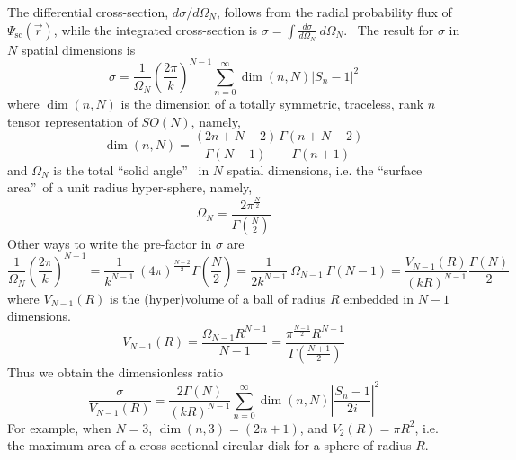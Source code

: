 \documentclass{article}%
\begin{document}
The differential cross-section, $d\sigma/d\Omega_{N}$, follows from the radial
probability flux of $\Psi_{\text{sc}}\left(  \overrightarrow{r}\right)  $,
while the integrated cross-section is $\sigma=\int\frac{d\sigma}{d\Omega_{N}%
}~d\Omega_{N}$. \ The result for $\sigma$ in $N$ spatial dimensions is%
\begin{equation}
\sigma=\frac{1}{\Omega_{N}}\left(  \frac{2\pi}{k}\right)  ^{N-1}\sum
_{n=0}^{\infty}\dim\left(  n,N\right)  \left\vert S_{n}-1\right\vert ^{2}
\label{SigmaN}%
\end{equation}
where $\dim\left(  n,N\right)  $ is the dimension of a totally symmetric,
traceless, rank $n$ tensor representation of $SO\left(  N\right)  $, namely,%
\begin{equation}
\dim\left(  n,N\right)  =\frac{\left(  2n+N-2\right)  }{\Gamma\left(
N-1\right)  }\frac{\Gamma\left(  n+N-2\right)  }{\Gamma\left(  n+1\right)  }%
\end{equation}
and $\Omega_{N}$ is the total \textquotedblleft solid angle\textquotedblright%
\ in $N$ spatial dimensions, i.e. the \textquotedblleft surface
area\textquotedblright\ of a unit radius hyper-sphere, namely,%
\begin{equation}
\Omega_{N}=\frac{2\pi^{\frac{N}{2}}}{\Gamma\left(  \frac{N}{2}\right)  }%
\end{equation}
Other ways to write the pre-factor in $\sigma$ are
\begin{equation}
\frac{1}{\Omega_{N}}\left(  \frac{2\pi}{k}\right)  ^{N-1}=\frac{1}{k^{N-1}%
}~\left(  4\pi\right)  ^{\frac{N-2}{2}}\Gamma\left(  \frac{N}{2}\right)
=\frac{1}{2k^{N-1}}~\Omega_{N-1}~\Gamma\left(  N-1\right)  =\frac
{V_{N-1}\left(  R\right)  }{\left(  kR\right)  ^{N-1}}\frac{\Gamma\left(
N\right)  }{2}%
\end{equation}
where $V_{N-1}\left(  R\right)  $ is the (hyper)volume of a ball of radius $R$
embedded in $N-1$ dimensions.%
\begin{equation}
V_{N-1}\left(  R\right)  =\frac{\Omega_{N-1}R^{N-1}}{N-1}=\frac{\pi
^{\frac{N-1}{2}}R^{N-1}}{\Gamma\left(  \tfrac{N+1}{2}\right)  }%
\end{equation}
Thus we obtain the dimensionless ratio%
\begin{equation}
\frac{\sigma}{V_{N-1}\left(  R\right)  }=\frac{2\Gamma\left(  N\right)
}{\left(  kR\right)  ^{N-1}}\sum_{n=0}^{\infty}\dim\left(  n,N\right)
\left\vert \frac{S_{n}-1}{2i}\right\vert ^{2} \label{SigmaNDimensionless}%
\end{equation}
For example, when $N=3$, $\dim\left(  n,3\right)  =\left(  2n+1\right)  $, and
$V_{2}\left(  R\right)  =\pi R^{2}$, i.e. the maximum area of a
cross-sectional circular disk for a sphere of radius $R$. \ 
\end{document}
